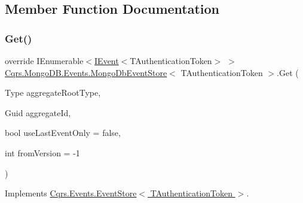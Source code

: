 \subsection{Member Function Documentation}
\mbox{\label{classCqrs_1_1MongoDB_1_1Events_1_1MongoDbEventStore_a7a1ac8e59dc5bff0bb6562fb4f43e8df_a7a1ac8e59dc5bff0bb6562fb4f43e8df}} 
\subsubsection{\texorpdfstring{Get()}{Get()}\hspace{0.1cm}{\footnotesize\ttfamily [1/2]}}
{\footnotesize\ttfamily override I\+Enumerable$<$\hyperlink{interfaceCqrs_1_1Events_1_1IEvent}{I\+Event}$<$T\+Authentication\+Token$>$ $>$ \hyperlink{classCqrs_1_1MongoDB_1_1Events_1_1MongoDbEventStore}{Cqrs.\+Mongo\+D\+B.\+Events.\+Mongo\+Db\+Event\+Store}$<$ T\+Authentication\+Token $>$.Get (\begin{DoxyParamCaption}\item[{Type}]{aggregate\+Root\+Type,  }\item[{Guid}]{aggregate\+Id,  }\item[{bool}]{use\+Last\+Event\+Only = {\ttfamily false},  }\item[{int}]{from\+Version = {\ttfamily -\/1} }\end{DoxyParamCaption})\hspace{0.3cm}{\ttfamily [virtual]}}



Implements \hyperlink{classCqrs_1_1Events_1_1EventStore_aa1d0d399a35c1e3b0759e27202695d8b_aa1d0d399a35c1e3b0759e27202695d8b}{Cqrs.\+Events.\+Event\+Store$<$ T\+Authentication\+Token $>$}.

\mbox{\label{classCqrs_1_1MongoDB_1_1Events_1_1MongoDbEventStore_ac886ca0a57ad86cb99ef0a3767db9280_ac886ca0a57ad86cb99ef0a3767db9280}} 
